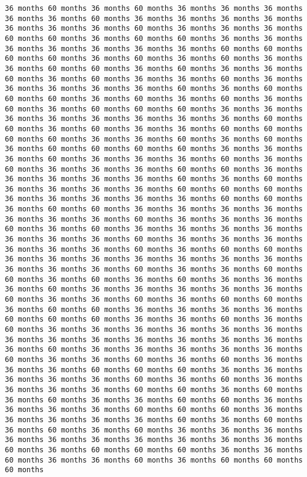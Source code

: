 \documentclass[11pt]{article}
\begin{document}
\begin{Verbatim}[commandchars=\\\{\}, frame=single, framerule=2mm, rulecolor=\color{outerrorbackground}]
36 months 60 months 36 months 60 months 36 months 36 months 36 months 36 months 36 months 60 months 36 months 36 months 36 months 36 months 36 months 36 months 36 months 60 months 36 months 36 months 36 months 60 months 60 months 36 months 60 months 60 months 36 months 36 months 36 months 36 months 36 months 36 months 36 months 60 months 60 months 60 months 60 months 36 months 60 months 36 months 60 months 36 months 36 months 60 months 60 months 36 months 60 months 36 months 36 months 60 months 36 months 60 months 36 months 36 months 60 months 36 months 36 months 36 months 36 months 36 months 60 months 36 months 60 months 60 months 60 months 36 months 60 months 36 months 60 months 36 months 60 months 36 months 60 months 60 months 60 months 36 months 36 months 36 months 36 months 36 months 36 months 36 months 36 months 60 months 60 months 36 months 60 months 36 months 36 months 60 months 60 months 60 months 60 months 36 months 36 months 60 months 36 months 60 months 36 months 60 months 60 months 60 months 60 months 36 months 36 months 36 months 60 months 36 months 36 months 36 months 60 months 36 months 60 months 36 months 36 months 36 months 60 months 60 months 36 months 36 months 36 months 36 months 36 months 60 months 36 months 60 months 36 months 36 months 36 months 36 months 60 months 60 months 60 months 36 months 36 months 36 months 36 months 36 months 60 months 60 months 36 months 60 months 60 months 36 months 36 months 36 months 36 months 36 months 36 months 36 months 60 months 36 months 36 months 36 months 60 months 36 months 60 months 36 months 36 months 36 months 36 months 36 months 36 months 36 months 60 months 36 months 36 months 36 months 36 months 36 months 36 months 60 months 36 months 60 months 60 months 36 months 36 months 36 months 36 months 36 months 36 months 36 months 36 months 36 months 36 months 60 months 36 months 36 months 60 months 60 months 36 months 60 months 36 months 60 months 36 months 36 months 36 months 60 months 36 months 36 months 36 months 36 months 36 months 60 months 36 months 36 months 60 months 36 months 60 months 60 months 36 months 60 months 60 months 36 months 36 months 36 months 36 months 60 months 60 months 60 months 36 months 36 months 60 months 36 months 60 months 36 months 36 months 36 months 36 months 36 months 36 months 36 months 36 months 36 months 36 months 36 months 36 months 36 months 36 months 60 months 36 months 36 months 36 months 36 months 36 months 60 months 36 months 36 months 60 months 36 months 60 months 36 months 36 months 36 months 60 months 60 months 60 months 36 months 36 months 36 months 36 months 36 months 60 months 36 months 60 months 36 months 36 months 36 months 36 months 60 months 60 months 36 months 60 months 36 months 60 months 36 months 36 months 60 months 60 months 36 months 36 months 36 months 36 months 60 months 60 months 60 months 36 months 36 months 36 months 36 months 36 months 60 months 36 months 60 months 36 months 60 months 36 months 60 months 36 months 36 months 36 months 36 months 36 months 36 months 36 months 36 months 36 months 36 months 60 months 36 months 60 months 60 months 60 months 36 months 36 months 60 months 36 months 36 months 60 months 36 months 60 months 60 months 60 months 
\end{Verbatim}
\end{document}
